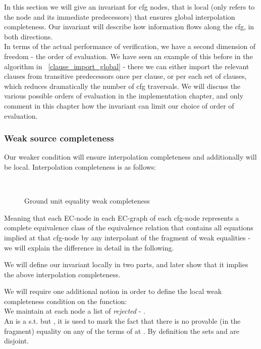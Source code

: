 In this section we will give an invariant for cfg nodes, that is local (only refers to the node and its immediate predecessors) that ensures global interpolation completeness. 
Our invariant will describe how information flows along the cfg, in both directions.\\
In terms of the actual performance of verification, we have a second dimension of freedom - the order of evaluation.
We have seen an example of this before in the algorithm in ~\ref{clause_import_global} - there we can either import the relevant clauses from transitive predecessors once per clause, or per each set of clauses, which reduces dramatically the number of cfg traversals. 
We will discuss the various possible orders of evaluation in the implementation chapter, 
and only comment in this chapter how the invariant can limit our choice of order of evaluation.

\subsubsection{Weak source completeness}
Our weaker condition will ensure interpolation completeness and additionally will be local.
Interpolation completeness is as follows:
\begin{figure}[H]
 \\
\caption{Ground unit equality weak completeness}
\label{ground_unit_equality_weak_completeness}
\end{figure}
Meaning that each EC-node in each EC-graph of each cfg-node represents a complete equivalence class of the equivalence relation that contains all equations implied at that cfg-node by any interpolant of the fragment of weak equalities - we will explain the difference in detail in the following.

We will define our invariant locally in two parts, and later show that it implies the above interpolation completeness.

We will require one additional notion in order to define the local weak completeness condition on the  function:\\
We maintain at each \cfg node  a list of \emph{rejected \gfa} - .\\
An \rgfa is a \gfa {} s.t.  but , it is used to mark the fact that there is no provable (in the fragment) equality on any of the terms of  at .
By definition the sets  and  are disjoint.

